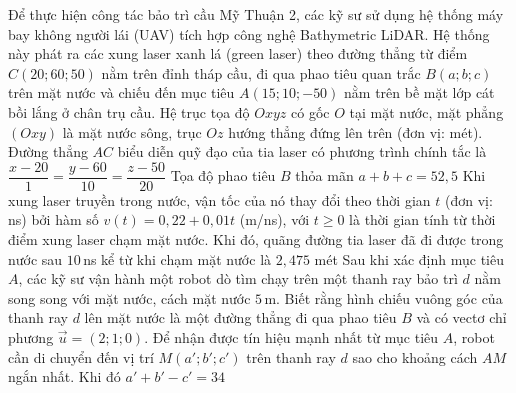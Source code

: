 \begin{ex}%
	Để thực hiện công tác bảo trì cầu Mỹ Thuận 2, các kỹ sư sử dụng hệ thống máy bay không người lái (UAV) tích hợp công nghệ Bathymetric LiDAR. Hệ thống này phát ra các xung laser xanh lá (green laser) theo đường thẳng từ điểm $C(20;60;50)$ nằm trên đỉnh tháp cầu, đi qua phao tiêu quan trắc $B(a;b;c)$ trên mặt nước và chiếu đến mục tiêu $A(15;10;-50)$ nằm trên bề mặt lớp cát bồi lắng ở chân trụ cầu. Hệ trục tọa độ $Oxyz$ có gốc $O$ tại mặt nước, mặt phẳng $(Oxy)$ là mặt nước sông, trục $Oz$ hướng thẳng đứng lên trên (đơn vị: mét).
	\choiceTF
	{Đường thẳng $AC$ biểu diễn quỹ đạo của tia laser có phương trình chính tắc là $\dfrac{x-20}{1} = \dfrac{y-60}{10} = \dfrac{z-50}{20}$}
	{Tọa độ phao tiêu $B$ thỏa mãn $a+b+c = 52{,}5$}
	{Khi xung laser truyền trong nước, vận tốc của nó thay đổi theo thời gian $t$ (đơn vị: ns) bởi hàm số $v(t) = 0{,}22+0{,}01t$ (m/ns), với $t \ge 0$ là thời gian tính từ thời điểm xung laser chạm mặt nước. Khi đó, quãng đường tia laser đã đi được trong nước sau $10\,$ns kể từ khi chạm mặt nước là $2{,}475$ mét}
	{Sau khi xác định mục tiêu $A$, các kỹ sư vận hành một robot dò tìm chạy trên một thanh ray bảo trì $d$ nằm song song với mặt nước, cách mặt nước $5\,$m. Biết rằng hình chiếu vuông góc của thanh ray $d$ lên mặt nước là một đường thẳng đi qua phao tiêu $B$ và có vectơ chỉ phương $\vec{u} = (2;1;0)$. Để nhận được tín hiệu mạnh nhất từ mục tiêu $A$, robot cần di chuyển đến vị trí $M(a';b';c')$ trên thanh ray $d$ sao cho khoảng cách $AM$ ngắn nhất. Khi đó $a'+b'-c' = 34$}
\end{ex}
